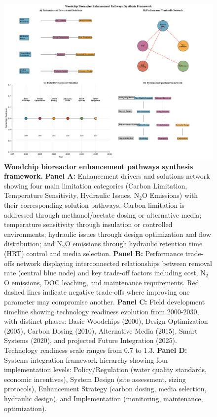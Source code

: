 \documentclass[12pt,a4paper]{article}
\begin{document}
\begin{figure}[H]
\centering
\includegraphics[width=1.0\textwidth]{fig_synthesis_enhancement_pathways}
\caption{\textbf{Woodchip bioreactor enhancement pathways synthesis framework.} 
\textbf{Panel A:} Enhancement drivers and solutions network showing four main limitation categories (Carbon Limitation, Temperature Sensitivity, Hydraulic Issues, N$_2$O Emissions) with their corresponding solution pathways. Carbon limitation is addressed through methanol/acetate dosing or alternative media; temperature sensitivity through insulation or controlled environments; hydraulic issues through design optimization and flow distribution; and N$_2$O emissions through hydraulic retention time (HRT) control and media selection.
\textbf{Panel B:} Performance trade-offs network displaying interconnected relationships between removal rate (central blue node) and key trade-off factors including cost, N$_2$O emissions, DOC leaching, and maintenance requirements. Red dashed lines indicate negative trade-offs where improving one parameter may compromise another.
\textbf{Panel C:} Field development timeline showing technology readiness evolution from 2000-2030, with distinct phases: Basic Woodchips (2000), Design Optimization (2005), Carbon Dosing (2010), Alternative Media (2015), Smart Systems (2020), and projected Future Integration (2025). Technology readiness scale ranges from 0.7 to 1.3.
\textbf{Panel D:} Systems integration framework hierarchy showing four implementation levels: Policy/Regulation (water quality standards, economic incentives), System Design (site assessment, sizing protocols), Enhancement Strategy (carbon dosing, media selection, hydraulic design), and Implementation (monitoring, maintenance, optimization).}
\label{fig:synthesis_pathways}
\end{figure}
\end{document}
